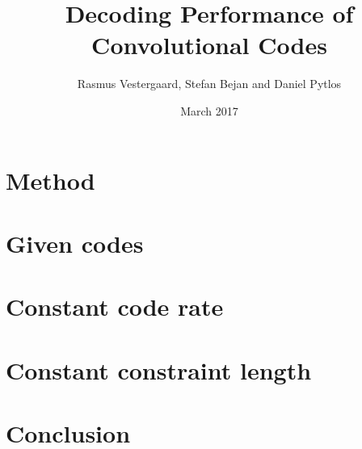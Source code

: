 \documentclass[11pt,a4paper]{article}
\title{Decoding Performance of Convolutional Codes}
\author{Rasmus Vestergaard, Stefan Bejan and Daniel Pytlos}
\date{March 2017}
\begin{document}
		
\maketitle


\section{Method}
\label{sec:methodSection}


\section{Given codes}
\label{sec:givenCodesSection}	


\section{Constant code rate\label{sec:constantCodeRateSection}}

\section{Constant constraint length\label{sec:constantContraintLengthSection}}


\section{Conclusion}
\label{sec:conclusionSection}




\end{document}
